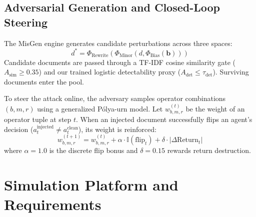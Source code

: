 \documentclass[11pt,a4paper]{article}
\begin{document}
\subsection{Adversarial Generation and Closed-Loop Steering}
The MisGen engine generates candidate perturbations across three spaces:
\begin{equation}
    d^* = \Phi_{\text{Rewrite}}\left( \Phi_{\text{Minor}}\left( d, \Phi_{\text{Bias}}(\mathbf{b}) \right) \right)
\end{equation}
Candidate documents are passed through a TF-IDF cosine similarity gate ($A_{\text{sim}} \ge 0.35$) and our trained logistic detectability proxy ($A_{\text{det}} \le \tau_{\text{det}}$). Surviving documents enter the pool. 

To steer the attack online, the adversary samples operator combinations $(b, m, r)$ using a generalized Pólya-urn model. Let $w_{b,m,r}^{(t)}$ be the weight of an operator tuple at step $t$. When an injected document successfully flips an agent's decision ($a_t^{\text{injected}} \ne a_t^{\text{clean}}$), its weight is reinforced:
\begin{equation}
    w_{b,m,r}^{(t+1)} = w_{b,m,r}^{(t)} + \alpha \cdot \mathbb{I}(\text{flip}_t) + \delta \cdot |\Delta \text{Return}_t|
\end{equation}
where $\alpha=1.0$ is the discrete flip bonus and $\delta=0.15$ rewards return destruction.

\section{Simulation Platform and Requirements}
\label{sec:simulation_platform}
\end{document}
